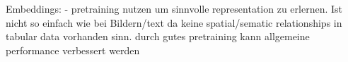 Embeddings:
- pretraining nutzen um sinnvolle representation zu erlernen. 
Ist nicht so einfach wie bei Bildern/text da keine spatial/sematic relationships in tabular data vorhanden sinn.
durch gutes pretraining kann allgemeine performance verbessert werden \cite{yoon2020VIMEExtendingSuccess}